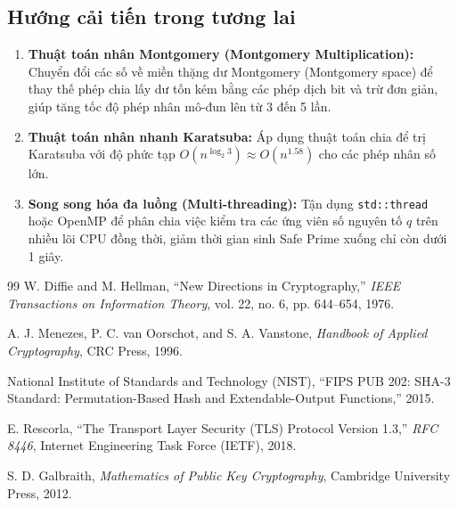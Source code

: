 \documentclass[12pt,a4paper]{article}
\theoremstyle{plain}
\begin{document}
\subsection{Hướng cải tiến trong tương lai}
\begin{enumerate}
    \item \textbf{Thuật toán nhân Montgomery (Montgomery Multiplication):} Chuyển đổi các số về miền thặng dư Montgomery (Montgomery space) để thay thế phép chia lấy dư tốn kém bằng các phép dịch bit và trừ đơn giản, giúp tăng tốc độ phép nhân mô-đun lên từ 3 đến 5 lần.
    \item \textbf{Thuật toán nhân nhanh Karatsuba:} Áp dụng thuật toán chia để trị Karatsuba với độ phức tạp $O(n^{\log_2 3}) \approx O(n^{1.58})$ cho các phép nhân số lớn.
    \item \textbf{Song song hóa đa luồng (Multi-threading):} Tận dụng \texttt{std::thread} hoặc OpenMP để phân chia việc kiểm tra các ứng viên số nguyên tố $q$ trên nhiều lõi CPU đồng thời, giảm thời gian sinh Safe Prime xuống chỉ còn dưới 1 giây.
\end{enumerate}

\newpage
\begin{thebibliography}{99}
W. Diffie and M. Hellman, ``New Directions in Cryptography,'' \textit{IEEE Transactions on Information Theory}, vol. 22, no. 6, pp. 644--654, 1976.

A. J. Menezes, P. C. van Oorschot, and S. A. Vanstone, \textit{Handbook of Applied Cryptography}, CRC Press, 1996.

National Institute of Standards and Technology (NIST), ``FIPS PUB 202: SHA-3 Standard: Permutation-Based Hash and Extendable-Output Functions,'' 2015.

E. Rescorla, ``The Transport Layer Security (TLS) Protocol Version 1.3,'' \textit{RFC 8446}, Internet Engineering Task Force (IETF), 2018.

S. D. Galbraith, \textit{Mathematics of Public Key Cryptography}, Cambridge University Press, 2012.
\end{thebibliography}
\end{document}
